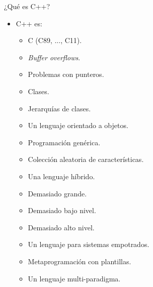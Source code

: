 \begin{frame}{¿Qué es C++?}
{\begin{itemize}
  \item C++ es:
    \begin{itemize}
      \item \pause  C (C89, ..., C11).
      \item \pause  \emph{Buffer overflows}.
      \item \pause  Problemas con punteros.
      \item \pause  Clases.
      \item \pause  Jerarquías de clases.
      \item \pause  Un lenguaje orientado a objetos.
      \item \pause  Programación genérica.
      \item \pause  Colección aleatoria de características.
      \item \pause  Una lenguaje híbrido.
      \item \pause  Demasiado grande.
      \item \pause  Demasiado bajo nivel.
      \item \pause  Demasiado alto nivel.
      \item \pause  Un lenguaje para sistemas empotrados.
      \item \pause  Metaprogramación con plantillas.
      \item \pause  Un lenguaje multi-paradigma.
    \end{itemize}
\end{itemize}
}
\end{frame}

